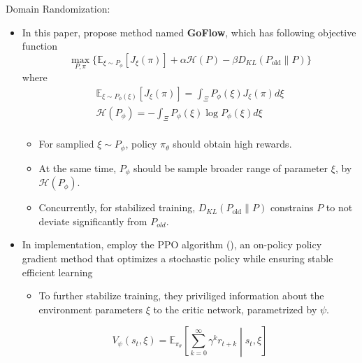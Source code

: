 \documentclass{beamer}
\newcommand{\mbb}[1]{\mathbb{#1}}
\newcommand{\mc}[1]{\mathcal{#1}}
\newcommand{\tb}[1]{\textbf{#1}}
\begin{document}
\begin{frame}{Domain Randomization: \cite{curtisFlowbasedDomainRandomization2025a}}
    \begin{itemize}
        \item In this paper, propose method named \tb{GoFlow}, which has following objective function
        \[
            \max_{P, \pi} \{\mbb{E}_{\xi \sim P_{\phi}} [J_\xi (\pi)] + \alpha \mc{H}(P) - \beta D_{KL}(P_{\text{old}}\parallel P)\}
        \]
        where
        \[
        \begin{gathered}
            \mbb{E}_{\xi \sim P_\phi(\xi)}[J_\xi(\pi)] = \int_\Xi P_\phi(\xi) J_\xi (\pi) d\xi \\
            \mc{H}(P_\phi) = - \int_\Xi P_\phi(\xi)\log P_\phi(\xi) d\xi \\
        \end{gathered}
        \]

        \begin{itemize}        
            \item For samplied $\xi \sim P_\phi$, policy $\pi_\theta$ should obtain high rewards.
            \item At the same time, $P_\phi$ should be sample broader range of parameter $\xi$, by $\mc{H}(P_\phi)$.
            \item Concurrently, for stabilized training, $D_{KL}(P_{\text{old}}\parallel P)$ constrains $P$ to not deviate significantly from $P_{old}$.
        \end{itemize}
        \item In implementation, employ the PPO algorithm (\cite{schulmanProximalPolicyOptimization2017}), an on-policy policy gradient method that optimizes a stochastic policy while ensuring stable efficient learning
        \begin{itemize}
            \item To further stabilize training, they priviliged information about the environment parameters $\xi$ to the critic network, parametrized by $\psi$.
        \end{itemize}
        \[
            V_\psi(s_t, \xi) = \mbb{E}_{\pi_\theta} \left[\sum_{k=0}^\infty \gamma^k r_{t+k} \middle| s_t, \xi \right]
        \]

    \end{itemize}
\end{frame}
\end{document}
